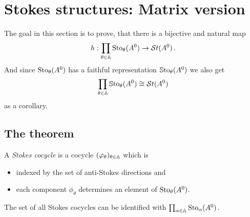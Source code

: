 \section{Stokes structures: Matrix version}\label{sec:mainThm2}
\begin{comment}
  See \cite{Loday1994}, \cite[Thm.4.3.11]{Loday2014}, \cite{boalch,thboalch}
  and \cite{babbitt1989local}
  and \cite{BJL1979Birkhoff}
\end{comment}
The goal in this section is to prove, that there is a bijective and natural map
\[
  h:\prod_{\theta\in\mathbb{A}}\operatorname{Sto}_\theta(A^0)\to\mathcal{S}{}t(A^0) \,.
\]
And since $\operatorname{Sto}_\theta(A^0)$ has a faithful representation $\operatorname{\mathbb{S}to}_\theta(A^0)$
we also get
\[
  \prod_{\theta\in\mathbb{A}}\operatorname{\mathbb{S}to}_\theta(A^0)\cong\mathcal{S}{}t(A^0)
\]
as a corollary.
\begin{comment}
  In other words, this theorem states, that in each element of $\St(A^0)$ is
  an unique $1$-cocyle, which is a Stokes cocycle.
\end{comment}

\subsection{The theorem}
\begin{comment}
  \cite[Thm.6.3.1]{sibuya1990Linear} says: if two differential equations have
  the same stokes phenomenon, they are analytically equivalent.
\end{comment}
\begin{defn}

  A \emph{Stokes cocycle} is a cocycle
  $(\varphi_\theta)_{\theta\in\mathbb{A}}$ which is
  \begin{itemize}
    \item indexed by the set of anti-Stokes directions and
    \item each component $\phi_\theta$ determines an element of
      $\operatorname{Sto}_\theta(A^0)$.
  \end{itemize}
  \begin{s-rem}
    The set of all Stokes cocycles can be identified with
    $\prod_{\alpha\in\mathbb{A}}\operatorname{Sto}_\alpha(A^0)$.
  \end{s-rem}
\end{defn}

